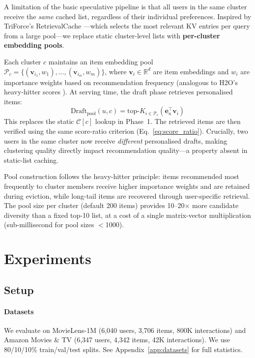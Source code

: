 \documentclass{article}
\begin{document}
A limitation of the basic speculative pipeline is that all users in the same cluster receive the \emph{same} cached list, regardless of their individual preferences. Inspired by TriForce's RetrievalCache \citep{triforce2024}---which selects the most relevant KV entries per query from a large pool---we replace static cluster-level lists with \textbf{per-cluster embedding pools}.

Each cluster $c$ maintains an item embedding pool $\mathcal{P}_c = \{(\mathbf{v}_{i_1}, w_1), \ldots, (\mathbf{v}_{i_m}, w_m)\}$, where $\mathbf{v}_i \in \mathbb{R}^d$ are item embeddings and $w_i$ are importance weights based on recommendation frequency (analogous to H2O's heavy-hitter scores \citep{h2o2023}). At serving time, the draft phase retrieves personalised items:
\begin{equation}
\text{Draft}_{\text{pool}}(u, c) = \text{top-}K_{i \in \mathcal{P}_c} \left( \mathbf{e}_u^\top \mathbf{v}_i \right)
\label{eq:pool_retrieval}
\end{equation}
This replaces the static $\mathcal{C}[c]$ lookup in Phase~1. The retrieved items are then verified using the same score-ratio criterion (Eq.~\ref{eq:score_ratio}). Crucially, two users in the same cluster now receive \emph{different} personalised drafts, making clustering quality directly impact recommendation quality---a property absent in static-list caching.

Pool construction follows the heavy-hitter principle: items recommended most frequently to cluster members receive higher importance weights and are retained during eviction, while long-tail items are recovered through user-specific retrieval. The pool size per cluster (default 200 items) provides 10--20$\times$ more candidate diversity than a fixed top-10 list, at a cost of a single matrix-vector multiplication (sub-millisecond for pool sizes $<$1000).

\section{Experiments}
\label{sec:experiments}

\subsection{Setup}

\paragraph{Datasets} We evaluate on MovieLens-1M \citep{movielens2015} (6,040 users, 3,706 items, 800K interactions) and Amazon Movies \& TV \citep{amazon2023} (6,347 users, 4,342 items, 42K interactions). We use 80/10/10\% train/val/test splits. See Appendix~\ref{app:datasets} for full statistics.
\end{document}
